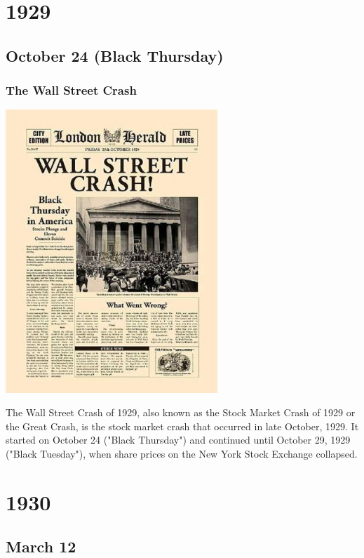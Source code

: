 \documentclass[11pt]{report}
\begin{document}
\chapter{1929}
\section{October 24 (Black Thursday)}
\subsection{The Wall Street Crash}
\vspace{2mm}\begin{center}\includegraphics[width=8cm]{./img/wallStreetCrash.jpg}\end{center}
The Wall Street Crash of 1929, also known as the Stock Market Crash of 1929 or the Great Crash, is the stock market crash that occurred in late October, 1929. It started on October 24 ("Black Thursday") and continued until October 29, 1929 ("Black Tuesday"), when share prices on the New York Stock Exchange collapsed.

\chapter{1930}
\section{March 12}
\end{document}

